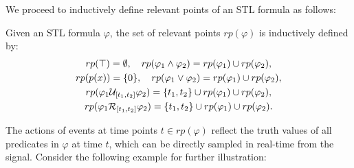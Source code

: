         We proceed to inductively define relevant points of an STL formula as follows:
            \begin{definition}
                Given an STL formula $\varphi$, the set of relevant points $rp(\varphi)$ is inductively defined by:
                \begin{gather*}
                rp(\top) = \emptyset,\quad rp(\varphi_1\land\varphi_2) = rp(\varphi_1)\cup rp(\varphi_2),\\ %
                rp(p(x)) = \{ 0 \},\quad rp(\varphi_1\lor\varphi_2) = rp(\varphi_1)\cup rp(\varphi_2),\\
                rp(\varphi_1\until_{[t_1,t_2]}\varphi_2) = \{t_1,t_2\}\cup rp(\varphi_1) \cup rp(\varphi_2),\\
                rp(\varphi_1\release_{[t_1,t_2]}\varphi_2) = \{t_1,t_2\}\cup rp(\varphi_1)\cup rp(\varphi_2).
                \end{gather*}
            \end{definition}

            
            
            
            The actions of events at time points $t \in rp(\varphi)$ reflect the truth values of all predicates in $\varphi$ at time $t$, which can be directly sampled in real-time from the signal. Consider the following example for further illustration:
            
